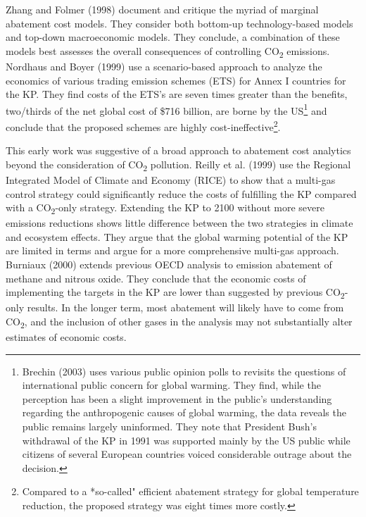 \documentclass[
  10pt,
]{article}
\begin{document}
Zhang and Folmer (1998) document and critique the myriad of marginal
abatement cost models. They consider both bottom-up technology-based
models and top-down macroeconomic models. They conclude, a combination
of these models best assesses the overall consequences of controlling
CO\textsubscript{2} emissions. Nordhaus and Boyer (1999) use a
scenario-based approach to analyze the economics of various trading
emission schemes (ETS) for Annex I countries for the KP. They find costs
of the ETS's are seven times greater than the benefits, two/thirds of
the net global cost of \$716 billion, are borne by the US\footnote{Brechin
  (2003) uses various public opinion polls to revisits the questions of
  international public concern for global warming. They find, while the
  perception has been a slight improvement in the public's understanding
  regarding the anthropogenic causes of global warming, the data reveals
  the public remains largely uninformed. They note that President Bush's
  withdrawal of the KP in 1991 was supported mainly by the US public
  while citizens of several European countries voiced considerable
  outrage about the decision.} and conclude that the proposed schemes
are highly cost-ineffective\footnote{Compared to a *so-called" efficient
  abatement strategy for global temperature reduction, the proposed
  strategy was eight times more costly.}.

This early work was suggestive of a broad approach to abatement cost
analytics beyond the consideration of CO\textsubscript{2} pollution.
Reilly et al. (1999) use the Regional Integrated Model of Climate and
Economy (RICE) to show that a multi-gas control strategy could
significantly reduce the costs of fulfilling the KP compared with a
CO\textsubscript{2}-only strategy. Extending the KP to 2100 without more
severe emissions reductions shows little difference between the two
strategies in climate and ecosystem effects. They argue that the global
warming potential of the KP are limited in terms and argue for a more
comprehensive multi-gas approach. Burniaux (2000) extends previous OECD
analysis to emission abatement of methane and nitrous oxide. They
conclude that the economic costs of implementing the targets in the KP
are lower than suggested by previous CO\textsubscript{2}-only results.
In the longer term, most abatement will likely have to come from
CO\textsubscript{2}, and the inclusion of other gases in the analysis
may not substantially alter estimates of economic costs.
\end{document}
